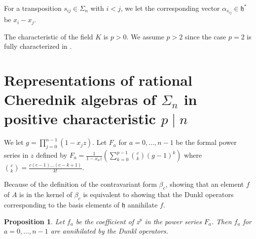 \documentclass{article}
\numberwithin{equation}{section}
\newtheorem{proposition}[equation]{Proposition}
\newcommand{\h}{\mathfrak{h}}
\begin{document}
For a transposition $s_{ij} \in \Sigma_n$ with $i<j$, we let the corresponding vector $\alpha_{s_{ij}} \in \h^*$ be $x_i-x_j$.

The characteristic of the field $K$ is $p>0$. We assume $p>2$ since the case $p=2$ is fully characterized in \cite{L}.

\section{Representations of rational Cherednik algebras of $\Sigma_n$ in positive characteristic $p \mid n$}



We let $g=\prod_{j=0}^{n-1} (1-x_jz)$. Let $F_a$ for $a=0,\dots,n-1$ be the formal power series in $z$ defined by $F_a=\frac{1}{1-x_az} \left( \sum_{k=0}^{p-1} \binom{c}{k}(g-1)^k\right)$ where $\binom{c}{k}=\frac{c(c-1)\dots(c-k+1)}{k!}$. 

Because of the definition of the contravariant form $\beta_c$, showing that an element $f$ of $A$ is in the kernel of $\beta_c$ is equivalent to showing that the Dunkl operators corresponding to the basis elements of $\h$ annihilate $f$.

\begin{proposition}\label{prop:ann} Let $f_a$ be the coefficient of $z^p$ in the power series $F_a$. Then $f_a$ for $a=0,\dots,n-1$ are annihilated by the Dunkl operators. 
\end{proposition}
\end{document}

